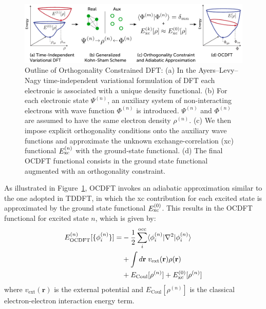 \documentclass{article}
\begin{document}
\begin{figure}[h!]
\includegraphics[width=6.5in]{figure_1.pdf}
\caption{Outline of Orthogonality Constrained DFT: (a) In the Ayers--Levy--Nagy time-independent variational formulation of DFT each electronic is associated with a unique density functional. (b) For each electronic state $\Psi^{(n)}$, an auxiliary system of non-interacting electrons with wave function $\Phi^{(n)}$ is introduced.   $\Psi^{(n)}$ and $\Phi^{(n)}$ are assumed to have the same electron density $\rho^{(n)}$. (c) We then impose explicit orthogonality conditions onto the auxiliary wave functions and approximate the unknown exchange-correlation (xc) functional $E_{\rm xc}^{(n)}$ with the ground-state functional. (d) The final OCDFT functional consists in the ground state functional augmented with an orthogonality constraint.}
\label{fig: OCDFTderiv}
\end{figure}

As illustrated in Figure~\ref{fig: OCDFTderiv}, OCDFT invokes an adiabatic approximation similar to the one adopted in TDDFT, in which the xc contribution for each excited state is approximated by the ground state functional $E^{(0)}_{\rm xc}$. This results in the OCDFT functional for excited state $n$, which is given by:
\begin{equation}
\begin{split}
E^{(n)}_{\rm OCDFT}[\{\phi^{(n)}_i\}] =& - \frac{1}{2} \sum^{\rm occ}_i \langle \phi^{(n)}_i| \nabla^2 |\phi^{(n)}_i \rangle \\
 &+ \int d\textbf{r} \;  v_{\text{ext}}(\textbf{r}) \rho(\textbf{r}) \\
&+  E_{\text{Coul}}[\rho^{(n)}] + E^{(0)}_{\text{xc}}[\rho^{(n)}]
\label{eq:OCDFT_E_ORIGINAL}
\end{split}
\end{equation}
where $v_{\text{ext}}(\textbf{r})$ is the external potential and $E_{\text{Coul}}[\rho^{(n)}]$ is the classical electron-electron interaction energy term.
\end{document}
